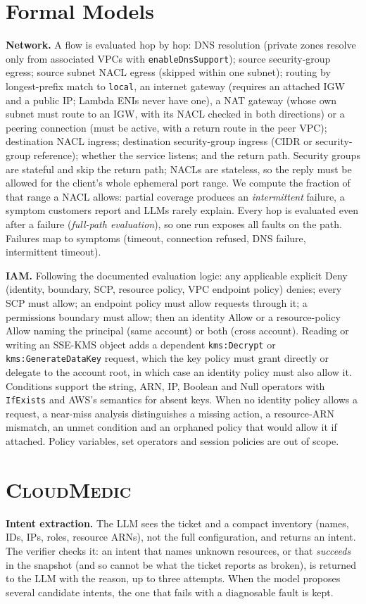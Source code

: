 \documentclass[conference]{IEEEtran}
\newcommand{\sys}{\textsc{CloudMedic}}
\begin{document}
\section{Formal Models}\label{sec:models}
\textbf{Network.} A flow is evaluated hop by hop: DNS resolution (private zones resolve only from associated VPCs with
\texttt{enableDnsSupport}); source security-group egress; source subnet NACL egress (skipped within one subnet); routing by
longest-prefix match to \texttt{local}, an internet gateway (requires an attached IGW and a public IP; Lambda ENIs never have
one), a NAT gateway (whose own subnet must route to an IGW, with its NACL checked in both directions) or a peering connection
(must be active, with a return route in the peer VPC); destination NACL ingress; destination security-group ingress
(CIDR or security-group reference); whether the service listens; and the return path. Security groups are stateful and
skip the return path; NACLs are stateless, so the reply must be allowed for the client's whole ephemeral port range. We
compute the fraction of that range a NACL allows: partial coverage produces an \emph{intermittent} failure, a symptom
customers report and LLMs rarely explain. Every hop is evaluated even after a failure (\emph{full-path evaluation}), so one
run exposes all faults on the path. Failures map to symptoms (timeout, connection refused, DNS failure, intermittent timeout).

\textbf{IAM.} Following the documented evaluation logic: any applicable explicit Deny (identity, boundary, SCP, resource
policy, VPC endpoint policy) denies; every SCP must allow; an endpoint policy must allow requests through it; a permissions
boundary must allow; then an identity Allow or a resource-policy Allow naming the principal (same account) or both (cross
account). Reading or writing an SSE-KMS object adds a dependent \texttt{kms:Decrypt} or \texttt{kms:GenerateDataKey} request,
which the key policy must grant directly or delegate to the account root, in which case an identity policy must also allow it.
Conditions support the string, ARN, IP, Boolean and Null operators with \texttt{IfExists} and AWS's semantics for absent keys.
When no identity policy allows a request, a near-miss analysis distinguishes a missing action, a resource-ARN mismatch, an
unmet condition and an orphaned policy that would allow it if attached. Policy variables, set operators and session policies
are out of scope.

\section{\sys}\label{sec:repair}
\textbf{Intent extraction.} The LLM sees the ticket and a compact inventory (names, IDs, IPs, roles, resource ARNs), not the
full configuration, and returns an intent. The verifier checks it: an intent that names unknown resources, or that
\emph{succeeds} in the snapshot (and so cannot be what the ticket reports as broken), is returned to the LLM with the reason,
up to three attempts. When the model proposes several candidate intents, the one that fails with a diagnosable fault is kept.
\end{document}
